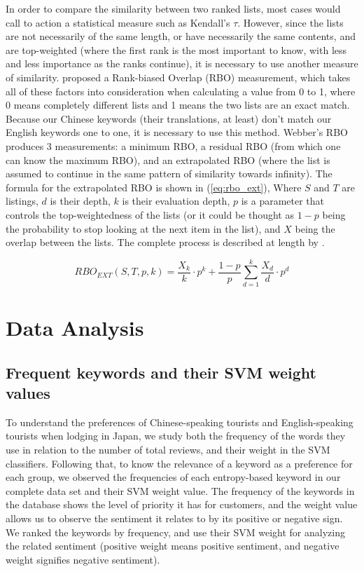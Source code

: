 In order to compare the similarity between two ranked lists, most cases would call to action a statistical measure such as Kendall's \(\tau\). However, since the lists are not necessarily of the same length, or have necessarily the same contents, and are top-weighted (where the first rank is the most important to know, with less and less importance as the ranks continue), it is necessary to use another measure of similarity. \cite{webber2010similarity} proposed a Rank-biased Overlap (RBO) measurement, which takes all of these factors into consideration when calculating a value from 0 to 1, where 0 means completely different lists and 1 means the two lists are an exact match. Because our Chinese keywords (their translations, at least) don't match our English keywords one to one, it is necessary to use this method. Webber's RBO produces 3 measurements: a minimum RBO, a residual RBO (from which one can know the maximum RBO), and an extrapolated RBO (where the list is assumed to continue in the same pattern of similarity towards infinity). The formula for the extrapolated RBO is shown in (\ref{eq:rbo_ext}), Where \(S\) and \(T\) are listings, \(d\) is their depth, \(k\) is their evaluation depth, \(p\) is a parameter that controls the top-weightedness of the lists (or it could be thought as \(1-p\) being the probability to stop looking at the next item in the list), and \(X\) being the overlap between the lists. The complete process is described at length by \cite{webber2010similarity}.

\begin{equation}\label{eq:rbo_ext}
RBO_{EXT}(S,T,p,k) = \frac{X_k}{k} \cdot p^k + \frac{1-p}{p} \sum_{d=1}^k{\frac{X_d}{d} \cdot p^d}
\end{equation}

\section{Data Analysis}\label{dataanalysis}

\subsection{Frequent keywords and their SVM weight values}\label{svmresults}

To understand the preferences of Chinese-speaking tourists and English-speaking tourists when lodging in Japan, we study both the frequency of the words they use in relation to the number of total reviews, and their weight in the SVM classifiers. Following that, to know the relevance of a keyword as a preference for each group, we observed the frequencies of each entropy-based keyword in our complete data set and their SVM weight value. The frequency of the keywords in the database shows the level of priority it has for customers, and the weight value allows us to observe the sentiment it relates to by its positive or negative sign. We ranked the keywords by frequency, and use their SVM weight for analyzing the related sentiment (positive weight means positive sentiment, and negative weight signifies negative sentiment). 

